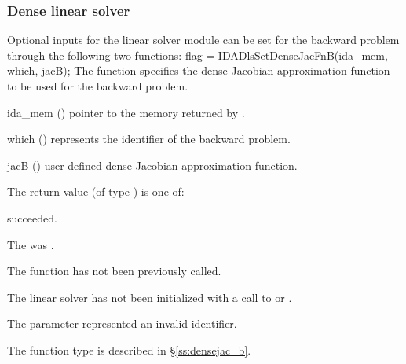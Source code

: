 \subsubsection{Dense linear solver}
Optional inputs for the {\idadense} linear solver module can be set for the backward
problem through the following two functions:
{
  flag = IDADlsSetDenseJacFnB(ida\_mem, which, jacB);
}
{
  The function  specifies the dense Jacobian
  approximation function to be used for the backward problem.
}
{
  \begin{args}
  \item[ida\_mem] ()
    pointer to the {\idas} memory returned by .
  \item[which] ()
    represents the identifier of the backward problem.
  \item[jacB] ()
    user-defined dense Jacobian approximation function.
  \end{args}
}
{
  The return value  (of type ) is one of:
  \begin{args}
  \item[\Id{IDADLS\_SUCCESS}] 
     succeeded.
  \item[\Id{IDADLS\_MEM\_NULL}]
    The  was .
  \item[\Id{IDADLS\_NO\_ADJ}]
    The function  has not been previously called.
  \item[\Id{IDADLS\_LMEM\_NULL}]
    The linear solver has not been initialized with a call to 
    or .
  \item[\Id{IDADLS\_ILL\_INPUT}]
    The parameter  represented an invalid identifier.
  \end{args}
}
{
  The function type  is described in \S\ref{ss:densejac_b}.
}


